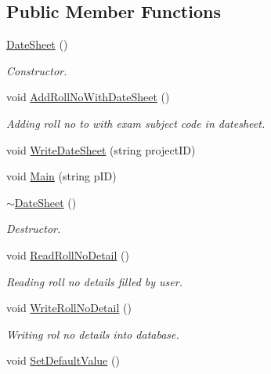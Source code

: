\subsection*{Public Member Functions}
\begin{DoxyCompactItemize}
\item 
\hyperlink{classDateSheet_a17a1e5adc9b48e53091b89061ee0a360}{Date\-Sheet} ()
\begin{DoxyCompactList}\small\item\em Constructor. \end{DoxyCompactList}\item 
void \hyperlink{classDateSheet_a8c1bd0daf35e3ea6f962a03fe78cdfa3}{Add\-Roll\-No\-With\-Date\-Sheet} ()
\begin{DoxyCompactList}\small\item\em Adding roll no to with exam subject code in datesheet. \end{DoxyCompactList}\item 
void \hyperlink{classDateSheet_a3f7ea57a0ed85dc6c09f0eda9c30016b}{Write\-Date\-Sheet} (string project\-I\-D)
\item 
void \hyperlink{classDateSheet_af749306c14297b5c93c16f48f551d5bb}{Main} (string p\-I\-D)
\item 
\hyperlink{classDateSheet_af17d25ae4f39caf7b9ea62d73541813b}{$\sim$\-Date\-Sheet} ()
\begin{DoxyCompactList}\small\item\em Destructor. \end{DoxyCompactList}\item 
\hypertarget{classDateSheet_a0d68cd26658c7dfc37ef512e6ed30528}{void \hyperlink{classDateSheet_a0d68cd26658c7dfc37ef512e6ed30528}{Read\-Roll\-No\-Detail} ()}\label{classDateSheet_a0d68cd26658c7dfc37ef512e6ed30528}

\begin{DoxyCompactList}\small\item\em Reading roll no details filled by user. \end{DoxyCompactList}\item 
\hypertarget{classDateSheet_ab34e451b5322710f149a1fff5386d852}{void \hyperlink{classDateSheet_ab34e451b5322710f149a1fff5386d852}{Write\-Roll\-No\-Detail} ()}\label{classDateSheet_ab34e451b5322710f149a1fff5386d852}

\begin{DoxyCompactList}\small\item\em Writing rol no details into database. \end{DoxyCompactList}\item 
\hypertarget{classDateSheet_a2eab7d9256cd56064671ac4974846a7a}{void \hyperlink{classDateSheet_a2eab7d9256cd56064671ac4974846a7a}{Set\-Default\-Value} ()}\label{classDateSheet_a2eab7d9256cd56064671ac4974846a7a}


\end{DoxyCompactItemize}
